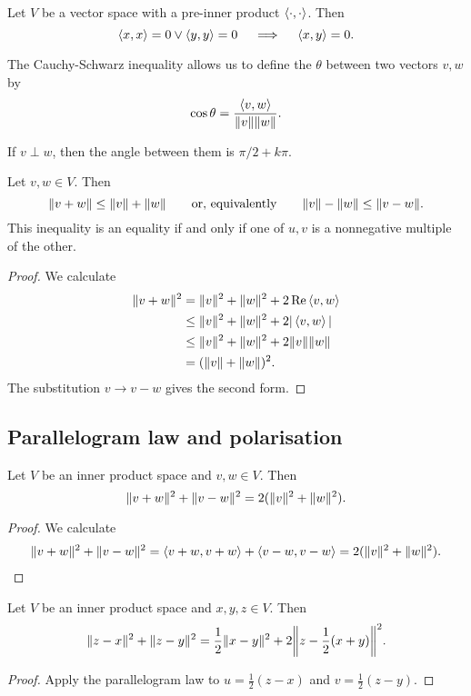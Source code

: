 \begin{corollary} \label{corollary:preInnerProductCSBZero}
Let $V$ be a vector space with a pre-inner product $\left\langle \cdot,\cdot \right\rangle$. Then
\[ \left\langle x,x \right\rangle=0\lor\left\langle y,y \right\rangle=0 \quad\implies\quad \left\langle x,y \right\rangle = 0. \]
\end{corollary}
\begin{definition}
The Cauchy-Schwarz inequality allows us to define the  $\theta$ between two vectors $v,w$ by
\[ \cos\theta = \frac{\left\langle v,w \right\rangle}{\lVert v\rVert\lVert w\rVert}.\]
\end{definition}
\begin{lemma}
If $v\perp w$, then the angle between them is $\pi/2 + k\pi$.
\end{lemma}

\begin{theorem}
Let $v,w\in V$. Then
\[ \lVert v+w\rVert \leq \lVert v\rVert+\lVert w\rVert \qquad\text{or, equivalently}\qquad \lVert v\rVert-\lVert w\rVert\leq \lVert v-w\rVert. \]
This inequality is an equality if and only if one of $u,v$ is a nonnegative multiple of the other.
\end{theorem}
\begin{proof}
We calculate
\begin{align*}
\lVert v+w\rVert^2 &= \lVert v\rVert^2+\lVert w\rVert^2+2\operatorname{Re}\left\langle v,w \right\rangle \\
&\leq \lVert v\rVert^2+\lVert w\rVert^2+2|\left\langle v,w \right\rangle| \\
&\leq \lVert v\rVert^2+\lVert w\rVert^2+2\lVert v\rVert\lVert w\rVert \\
&= (\lVert v\rVert+\lVert w\rVert)^2.
\end{align*}
The substitution $v\to v-w$ gives the second form.
\end{proof}

\subsection{Parallelogram law and polarisation}
\begin{theorem}
Let $V$ be an inner product space and $v,w\in V$. Then
\[ \lVert v+w\rVert^2 + \lVert v-w\rVert^2 = 2 (\lVert v\rVert^2+\lVert w\rVert^2). \]
\end{theorem}
\begin{proof}
We calculate
\begin{align*}
\lVert v+w\rVert^2 + \lVert v-w\rVert^2 = \left\langle v+w, v+w \right\rangle+\left\langle v-w,v-w \right\rangle = 2(\lVert v\rVert^2 + \lVert w\rVert^2).
\end{align*}
\end{proof}
\begin{corollary}
Let $V$ be an inner product space and $x,y,z\in V$. Then
\[ \norm{z-x}^2 + \norm{z-y}^2 = \frac{1}{2}\norm{x-y}^2 + 2\norm*{z-\frac{1}{2}(x+y)}^2. \]
\end{corollary}
\begin{proof}
Apply the parallelogram law to $u = \frac{1}{2}(z-x)$ and $v = \frac{1}{2}(z-y)$.
\end{proof}

